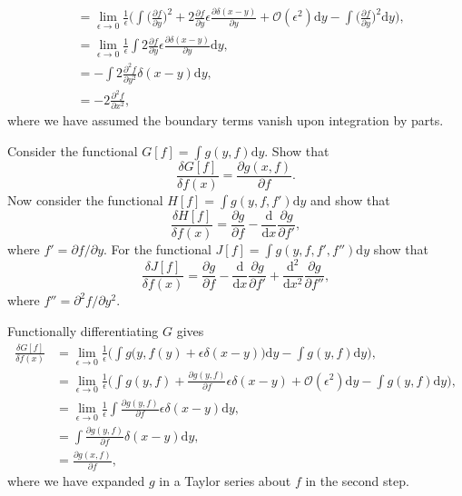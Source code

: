\documentclass[../qft-for-the-gifted-amateur.tex]{subfiles}
\begin{document}
\begin{questions}
\begin{solution}
\begin{align*}
			&= \lim_{\epsilon\to0}\frac{1}{\epsilon}\Big(\int\Big(\frac{\partial{f}}{\partial{y}}\Big)^2 + 2\frac{\partial{f}}{\partial{y}}\epsilon\frac{\partial\delta(x-y)}{\partial{y}} + \mathcal{O}(\epsilon^2)\mathrm{d}y - \int\Big(\frac{\partial{f}}{\partial{y}}\Big)^2\mathrm{d}y\Big), \\
			&= \lim_{\epsilon\to0}\frac{1}{\epsilon}\int2\frac{\partial{f}}{\partial{y}}\epsilon\frac{\partial\delta(x-y)}{\partial{y}}\mathrm{d}y, \\
			&= -\int2\frac{\partial^2f}{\partial{y}^2}\delta(x - y)\mathrm{d}y, \\
			&= -2\frac{\partial^2f}{\partial{x}^2},
		\end{align*}
		where we have assumed the boundary terms vanish upon integration by parts.
	\end{solution}
	
	\question Consider the functional $G[f] = \int g(y, f)\mathrm{d}y$. Show that
	\[
		\frac{\delta{G}[f]}{\delta{f}(x)} = \frac{\partial{g}(x,f)}{\partial{f}}.
	\]
	Now consider the functional $H[f] = \int g(y, f, f') \mathrm{d}y$ and show that
	\[
		\frac{\delta{H}[f]}{\delta{f}(x)} = \frac{\partial{g}}{\partial{f}} - \frac{\mathrm{d}}{\mathrm{d}x}\frac{\partial{g}}{\partial{f'}},
	\]
	where $f' = \partial{f}/\partial{y}$. For the functional $J[f] = \int g(y, f, f', f'')\mathrm{d}y$ show that
	\[
		\frac{\delta{J}[f]}{\delta{f}(x)} = \frac{\partial{g}}{\partial{f}} - \frac{\mathrm{d}}{\mathrm{d}x}\frac{\partial{g}}{\partial{f'}} + \frac{\mathrm{d}^2}{\mathrm{d}x^2}\frac{\partial{g}}{\partial{f''}},
	\]
	where $f'' = \partial^2f/\partial{y}^2$.
	
	\begin{solution}
		Functionally differentiating $G$ gives
		\begin{align*}
			\frac{\delta{G}[f]}{\delta{f}(x)} &= \lim_{\epsilon\to0}\frac{1}{\epsilon}\Big(\int g\big(y, f(y) + \epsilon\delta(x - y)\big)\mathrm{d}y - \int g(y, f)\mathrm{d}y\Big), \\
			&= \lim_{\epsilon\to0}\frac{1}{\epsilon}\Big(\int g(y, f) + \frac{\partial{g(y, f)}}{\partial{f}}\epsilon\delta(x - y) + \mathcal{O}(\epsilon^2)\mathrm{d}y - \int g(y, f)\mathrm{d}y\Big), \\
			&= \lim_{\epsilon\to0}\frac{1}{\epsilon}\int\frac{\partial{g}(y, f)}{\partial{f}}\epsilon\delta(x - y)\mathrm{d}y, \\
			&= \int\frac{\partial{g}(y, f)}{\partial{f}}\delta(x - y)\mathrm{d}y, \\
			&= \frac{\partial{g}(x, f)}{\partial{f}},
		\end{align*}
		where we have expanded $g$ in a Taylor series about $f$ in the second step.
		

\end{solution}
\end{questions}
\end{document}
